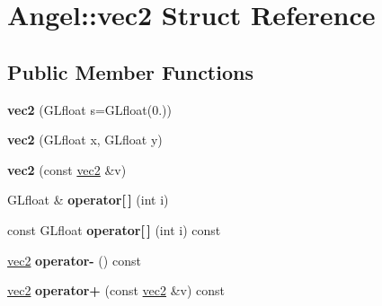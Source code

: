\hypertarget{struct_angel_1_1vec2}{\section{\-Angel\-:\-:vec2 \-Struct \-Reference}
\label{struct_angel_1_1vec2}
}
\subsection*{\-Public \-Member \-Functions}
\begin{DoxyCompactItemize}
\item 
\hypertarget{struct_angel_1_1vec2_ab2463ddb6aaaa67251004b90f03530fa}{{\bfseries vec2} (\-G\-Lfloat s=\-G\-Lfloat(0.))}\label{struct_angel_1_1vec2_ab2463ddb6aaaa67251004b90f03530fa}

\item 
\hypertarget{struct_angel_1_1vec2_a8e55cc0bb681ca7a747721cab122d830}{{\bfseries vec2} (\-G\-Lfloat x, \-G\-Lfloat y)}\label{struct_angel_1_1vec2_a8e55cc0bb681ca7a747721cab122d830}

\item 
\hypertarget{struct_angel_1_1vec2_aa2ec5b81c4b97019486b0595db6f35a1}{{\bfseries vec2} (const \hyperlink{struct_angel_1_1vec2}{vec2} \&v)}\label{struct_angel_1_1vec2_aa2ec5b81c4b97019486b0595db6f35a1}

\item 
\hypertarget{struct_angel_1_1vec2_a2605b81b6230d8d9184f3a06ff3fe7ae}{\-G\-Lfloat \& {\bfseries operator\mbox{[}$\,$\mbox{]}} (int i)}\label{struct_angel_1_1vec2_a2605b81b6230d8d9184f3a06ff3fe7ae}

\item 
\hypertarget{struct_angel_1_1vec2_a83725a082bca8ea73a2171bb4596c1bd}{const \-G\-Lfloat {\bfseries operator\mbox{[}$\,$\mbox{]}} (int i) const }\label{struct_angel_1_1vec2_a83725a082bca8ea73a2171bb4596c1bd}

\item 
\hypertarget{struct_angel_1_1vec2_a3b29693925c8026f75572dd13cefee5a}{\hyperlink{struct_angel_1_1vec2}{vec2} {\bfseries operator-\/} () const }\label{struct_angel_1_1vec2_a3b29693925c8026f75572dd13cefee5a}

\item 
\hypertarget{struct_angel_1_1vec2_a93606208e7b65d4bb8004f498b22934f}{\hyperlink{struct_angel_1_1vec2}{vec2} {\bfseries operator+} (const \hyperlink{struct_angel_1_1vec2}{vec2} \&v) const }\label{struct_angel_1_1vec2_a93606208e7b65d4bb8004f498b22934f}


\end{DoxyCompactItemize}
